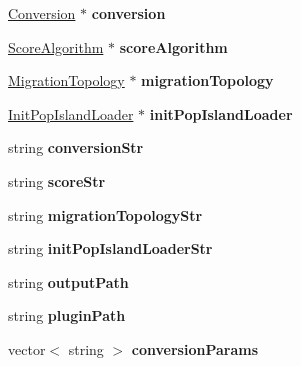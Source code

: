 \begin{DoxyCompactItemize}
\mbox{\label{classConfiguration_a72f20f04729bd66d2945972e48070322}} 
\mbox{\hyperlink{classConversion}{Conversion}} $\ast$ {\bfseries conversion}
\item 
\mbox{\label{classConfiguration_a96a79539270b6aaa05734d4b57eb2b1c}} 
\mbox{\hyperlink{classScoreAlgorithm}{Score\+Algorithm}} $\ast$ {\bfseries score\+Algorithm}
\item 
\mbox{\label{classConfiguration_a57feeed1a014585d1c7d2f0ee994cbbc}} 
\mbox{\hyperlink{classMigrationTopology}{Migration\+Topology}} $\ast$ {\bfseries migration\+Topology}
\item 
\mbox{\label{classConfiguration_a6df93f069e21cd0705083d342e92fc98}} 
\mbox{\hyperlink{classInitPopIslandLoader}{Init\+Pop\+Island\+Loader}} $\ast$ {\bfseries init\+Pop\+Island\+Loader}
\item 
\mbox{\label{classConfiguration_a722d0a4d61d0950019aea0e614472a8c}} 
string {\bfseries conversion\+Str}
\item 
\mbox{\label{classConfiguration_a1700c2912146e6050363af27724b4d7e}} 
string {\bfseries score\+Str}
\item 
\mbox{\label{classConfiguration_a91cb5c6b01fe5738948009128912bb4f}} 
string {\bfseries migration\+Topology\+Str}
\item 
\mbox{\label{classConfiguration_ab7e087c6c9f81ac38a4f089cb86bf80c}} 
string {\bfseries init\+Pop\+Island\+Loader\+Str}
\item 
\mbox{\label{classConfiguration_a62365e8e6786e49940c08a2509ec13c1}} 
string {\bfseries output\+Path}
\item 
\mbox{\label{classConfiguration_a98150bb85e4dc63bdac5099bb1a1f5fc}} 
string {\bfseries plugin\+Path}
\item 
\mbox{\label{classConfiguration_a4c7a3e7b6fca3745c285c80f9e6de41e}} 
vector$<$ string $>$ {\bfseries conversion\+Params}

\end{DoxyCompactItemize}
